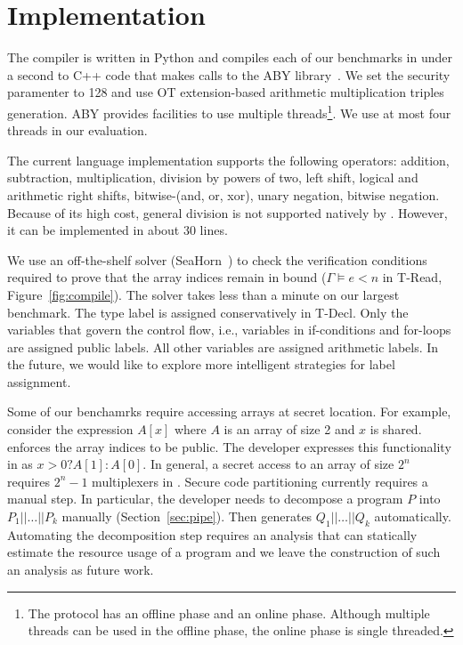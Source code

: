 \section{Implementation}
\label{sec:impl}
The  \tool compiler is written in Python and
compiles each of our benchmarks in under a second to C++ code that makes calls to the ABY
library~\cite{aby}. We set the security paramenter to 128 and use OT extension-based arithmetic multiplication triples generation. ABY provides facilities to use multiple threads\footnote{The protocol has an offline phase and an online phase. Although multiple threads can be used in the offline phase, the online phase is single threaded.}. We use at most four threads in our evaluation.

The current language implementation supports the following operators:
addition, subtraction, multiplication, division by powers of two, left shift,
logical and arithmetic right shifts, bitwise-(and, or, xor), unary negation,
bitwise negation. Because of its high cost, general division is not supported natively by \tool.
However, it can be implemented in about 30 lines.

We use an off-the-shelf solver
(SeaHorn~\cite{seahorn}) to check the verification conditions required
to prove that the array indices remain in bound ($\Gamma\vDash e < n$ in {\sc T-Read}, Figure~\ref{fig:compile}). The solver takes less
than a minute on our largest benchmark.
The type label is assigned conservatively in  {\sc T-Decl}.
Only the variables that govern the control flow, i.e., variables
in if-conditions and for-loops are assigned public labels.
All other variables are assigned arithmetic labels.
In the future, we would like to explore more intelligent strategies for label assignment.

Some of our benchamrks require accessing arrays at secret location.
For example, consider the expression $A[x]$ where $A$ is an array of size 2 and $x$ is shared.
\tool enforces the array indices to be public. The developer expresses this functionality in \tool
as $x > 0 ? A[1] : A[0]$. In general, a secret access to an array of size $2^n$ requires $2^{n}-1$ multiplexers in \tool. Secure code partitioning currently requires a manual step.
In particular, the developer needs to decompose a program $P$ into $P_1||\ldots||P_k$ manually (Section~\ref{sec:pipe}). Then \tool generates $Q_1||\ldots||Q_k$ automatically.
Automating the decomposition step requires an analysis that can 
statically estimate the resource usage of a \tool program and we leave the construction of such
an analysis as future work.

